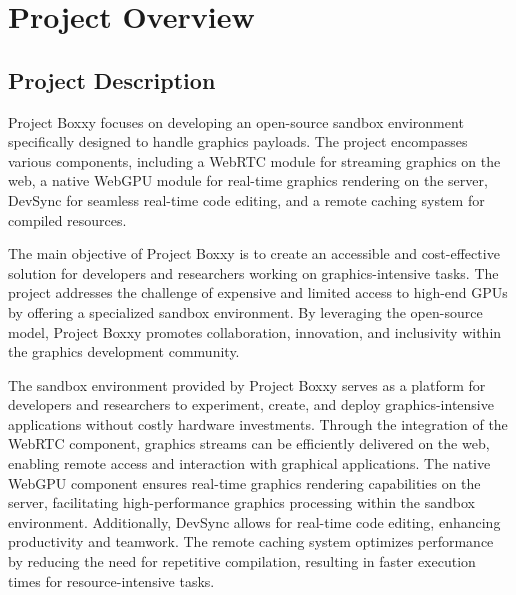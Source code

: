 
\chapter{Project Overview} %

\label{Chapter1} %



\section{Project Description}

Project Boxxy focuses on developing an open-source sandbox environment specifically designed to handle graphics payloads.
The project encompasses various components, including a WebRTC module for streaming graphics on the web, a native WebGPU module for real-time graphics rendering on the server, DevSync for seamless real-time code editing, and a remote caching system for compiled resources.

The main objective of Project Boxxy is to create an accessible and cost-effective solution for developers and researchers working on graphics-intensive tasks.
The project addresses the challenge of expensive and limited access to high-end GPUs by offering a specialized sandbox environment.
By leveraging the open-source model, Project Boxxy promotes collaboration, innovation, and inclusivity within the graphics development community.

The sandbox environment provided by Project Boxxy serves as a platform for developers and researchers to experiment, create, and deploy graphics-intensive applications without costly hardware investments.
Through the integration of the WebRTC component, graphics streams can be efficiently delivered on the web, enabling remote access and interaction with graphical applications.
The native WebGPU component ensures real-time graphics rendering capabilities on the server, facilitating high-performance graphics processing within the sandbox environment.
Additionally, DevSync allows for real-time code editing, enhancing productivity and teamwork.
The remote caching system optimizes performance by reducing the need for repetitive compilation, resulting in faster execution times for resource-intensive tasks.

